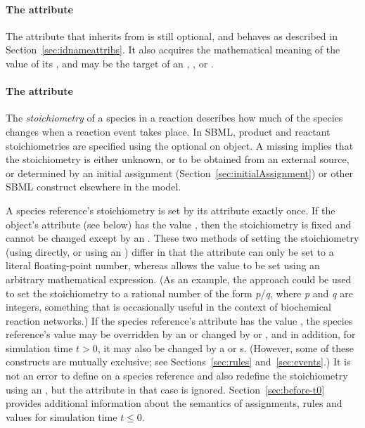 \begin{blockChanged}
\paragraph{The  attribute}

The  attribute that \SpeciesReference inherits from \SBase is still optional, and behaves as described in Section~\ref{sec:idnameattribs}.  It also acquires the mathematical meaning of the value of its , and may be the target of an \InitialAssignment, \EventAssignment, or \Rule.
\end{blockChanged}

\paragraph{The  attribute}

The {\em stoichiometry} of a species in a reaction describes how
much of the species changes when a reaction event takes place.  In
SBML, product and reactant stoichiometries are specified using the
optional  on \SpeciesReference object.    A missing
 implies that the stoichiometry is either
unknown, or to be obtained from an external source, or determined
by an initial assignment (Section~\ref{sec:initialAssignment}) or
other SBML construct elsewhere in the model.

A species reference's stoichiometry is set by its
 attribute exactly once.  If the
\SpeciesReference object's  attribute (see below)
has the value , then the stoichiometry is fixed and
cannot be changed except by an \InitialAssignment.  These two
methods of setting the stoichiometry (\ie using
 directly, or using an \InitialAssignment)
differ in that the  attribute can only be set
to a literal floating-point number, whereas \InitialAssignment
allows the value to be set using an arbitrary mathematical
expression.  (As an example, the approach could be used to set the
stoichiometry to a rational number of the form \emph{p}/\emph{q},
where \emph{p} and \emph{q} are integers, something that is
occasionally useful in the context of biochemical reaction
networks.)  If the species reference's  attribute
has the value , the species reference's value may be
overridden by an \InitialAssignment or changed by \AssignmentRule
or \AlgebraicRule, and in addition, for simulation time $t > 0$,
it may also be changed by a \RateRule or \Event{}s.  (However,
some of these constructs are mutually exclusive; see
Sections~\ref{sec:rules} and~\ref{sec:events}.)  It is not an
error to define  on a species reference and
also redefine the stoichiometry using an \InitialAssignment, but
the  attribute in that case is ignored.
Section~\ref{sec:before-t0} provides additional information about
the semantics of assignments, rules and values for simulation time
$t \leq 0$.

